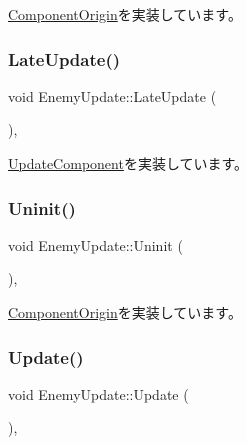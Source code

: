 \mbox{\hyperlink{class_component_origin_a9f674891257f2272b1636d8b6bb05d81}{Component\+Origin}}を実装しています。

\mbox{\label{class_enemy_update_ae14e4ebb42ad9043534e53edcba5b242}} 
\subsubsection{\texorpdfstring{Late\+Update()}{LateUpdate()}}
{\footnotesize\ttfamily void Enemy\+Update\+::\+Late\+Update (\begin{DoxyParamCaption}{ }\end{DoxyParamCaption})\hspace{0.3cm}{\ttfamily [override]}, {\ttfamily [virtual]}}



\mbox{\hyperlink{class_update_component_aecc61593be4d1feff2db4d9ff1f83f9f}{Update\+Component}}を実装しています。

\mbox{\label{class_enemy_update_a294a5d4c65551af43e933cb65036f279}} 
\subsubsection{\texorpdfstring{Uninit()}{Uninit()}}
{\footnotesize\ttfamily void Enemy\+Update\+::\+Uninit (\begin{DoxyParamCaption}{ }\end{DoxyParamCaption})\hspace{0.3cm}{\ttfamily [override]}, {\ttfamily [virtual]}}



\mbox{\hyperlink{class_component_origin_a9f89a93f9c1954bd53f9750e35e6089d}{Component\+Origin}}を実装しています。

\mbox{\label{class_enemy_update_ae9662f3a2d064dc69c0d68293e60f051}} 
\subsubsection{\texorpdfstring{Update()}{Update()}}
{\footnotesize\ttfamily void Enemy\+Update\+::\+Update (\begin{DoxyParamCaption}{ }\end{DoxyParamCaption})\hspace{0.3cm}{\ttfamily [override]}, {\ttfamily [virtual]}}



